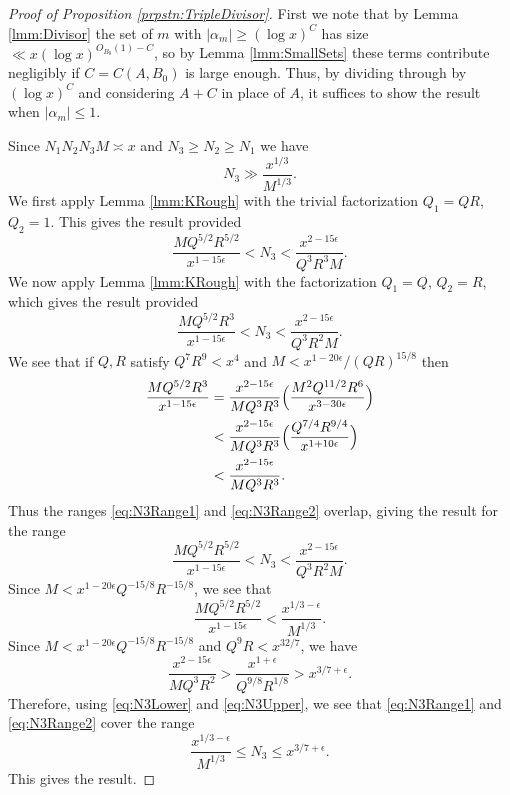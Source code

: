 \documentclass[10pt]{amsart}
\theoremstyle{plain}
\numberwithin{equation}{section}
\begin{document}
%
%
%
%
%
%
%
%
\begin{proof}[Proof of Proposition \ref{prpstn:TripleDivisor}]
First we note that by Lemma \ref{lmm:Divisor} the set of $m$ with $|\alpha_m|\ge(\log{x})^C$ has size $\ll x(\log{x})^{O_{B_0}(1)-C}$, so by Lemma \ref{lmm:SmallSets} these terms contribute negligibly if $C=C(A,B_0)$ is large enough. Thus, by dividing through by $(\log{x})^{C}$ and considering $A+C$ in place of $A$, it suffices to show the result when $|\alpha_m|\le 1$.

Since $N_1N_2N_3M\asymp x$ and $N_3\ge N_2\ge N_1$ we have
\[
N_3\gg \frac{x^{1/3}}{M^{1/3}}.
\]
We first apply Lemma \ref{lmm:KRough} with the trivial factorization $Q_1=Q R$, $Q_2=1$. This gives the result provided
\begin{equation}
\frac{M Q^{5/2} R^{5/2} }{x^{1-15\epsilon}}<N_3<\frac{x^{2-15\epsilon} }{Q^3 R^3 M}.\label{eq:N3Range1}
\end{equation}
We now apply Lemma \ref{lmm:KRough} with the factorization $Q_1=Q$, $Q_2=R$, which gives the result provided
\begin{equation}
\frac{M Q^{5/2}R^{3}}{x^{1-15\epsilon}}<N_3<\frac{x^{2-15\epsilon}}{Q^3 R^2 M}.\label{eq:N3Range2}
\end{equation}
We see that if $Q,R$ satisfy $Q^7 R^9<x^4$ and $M<x^{1-20\epsilon}/(QR)^{15/8}$ then
\begin{align*}
\frac{M Q^{5/2} R^3}{x^{1-15\epsilon}}&=\frac{x^{2-15\epsilon} }{M Q^3 R^3}\Bigl(\frac{M^2 Q^{11/2} R^6}{x^{3-30\epsilon}}\Bigr)\\
&<\frac{x^{2-15\epsilon}}{M Q^3 R^3}\Bigl(\frac{Q^{7/4}R^{9/4}}{x^{1+10\epsilon}}\Bigr)\\
&<\frac{x^{2-15\epsilon} }{M Q^3 R^3}.
\end{align*}
Thus the ranges \eqref{eq:N3Range1} and \eqref{eq:N3Range2} overlap, giving the result for the range
\[
\frac{M Q^{5/2}R^{5/2}}{x^{1-15\epsilon}}<N_3<\frac{x^{2-15\epsilon} }{Q^3 R^2 M}.
\]
Since $M<x^{1-20\epsilon} Q^{-15/8}R^{-15/8}$, we see that 
\begin{equation}
\frac{M Q^{5/2} R^{5/2}}{x^{1-15\epsilon}}<\frac{x^{1/3-\epsilon}}{M^{1/3}}.\label{eq:N3Lower}
\end{equation}
Since $M<x^{1-20\epsilon} Q^{-15/8}R^{-15/8}$ and $Q^9 R<x^{32/7}$, we have
\begin{equation}
\frac{x^{2-15\epsilon}}{M Q^3 R^2}>\frac{x^{1+\epsilon} }{Q^{9/8}R^{1/8}}>x^{3/7+\epsilon}.\label{eq:N3Upper}
\end{equation}
Therefore, using \eqref{eq:N3Lower} and \eqref{eq:N3Upper}, we see that \eqref{eq:N3Range1} and \eqref{eq:N3Range2} cover the range
\[
\frac{x^{1/3-\epsilon }}{M^{1/3}}\le N_3\le x^{3/7+\epsilon}.
\]
This gives the result.
\end{proof}
\end{document}
